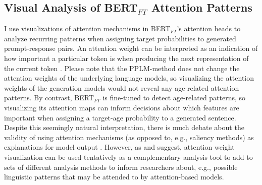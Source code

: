 
\newpage
\subsection{Visual Analysis of BERT$_{FT}$ Attention Patterns}
I use visualizations of attention mechanisms \citep{vig-2019-multiscale} in BERT$_{FT}$'s attention heads to analyze recurring patterns when assigning target probabilities to generated prompt-response pairs. An attention weight can be interpreted as an indication of how important a particular token is when producing the next representation of the current token \citep{DBLP:journals/corr/BahdanauCB14, clark-etal-2019-bert}. Please note that the PPLM-method does not change the attention weights of the underlying language models, so visualizing the attention weights of the generation models would not reveal any age-related attention patterns. By contrast, BERT$_{FT}$ is fine-tuned to detect age-related patterns, so visualizing its attention maps can inform decisions about which features are important when assigning a target-age probability to a generated sentence. Despite this seemingly natural interpretation, there is much debate about the validity of using attention mechanisms (as opposed to, e.g., saliency methods) as explanations for model output \citep{jain-wallace-2019-attention, wiegreffe-pinter-2019-attention, bastings-filippova-2020-elephant}. However, as \cite{vig-2019-multiscale} and \cite{clark-etal-2019-bert} suggest, attention weight visualization can be used tentatively as a complementary analysis tool to add to sets of different analysis methods to inform researchers about, e.g., possible linguistic patterns that may be attended to by attention-based models.

